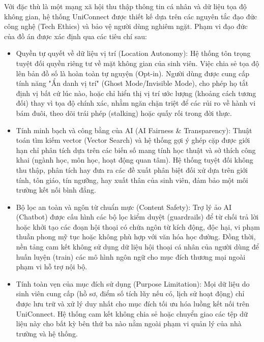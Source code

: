 Với đặc thù là một mạng xã hội thu thập thông tin cá nhân và dữ liệu tọa độ không gian, hệ thống UniConnect được thiết kế dựa trên các nguyên tắc đạo đức công nghệ (Tech Ethics) và bảo vệ người dùng nghiêm ngặt. Phạm vi đạo đức của đồ án được xác định qua các tiêu chí sau:

\begin{itemize}
    \item Quyền tự quyết về dữ liệu vị trí (Location Autonomy): Hệ thống tôn trọng tuyệt đối quyền riêng tư về mặt không gian của sinh viên. Việc chia sẻ tọa độ lên bản đồ số là hoàn toàn tự nguyện (Opt-in). Người dùng được cung cấp tính năng "Ẩn danh vị trí" (Ghost Mode/Invisible Mode), cho phép họ tắt định vị bất cứ lúc nào, hoặc chỉ hiển thị vị trí ước lượng (khoảng cách tương đối) thay vì tọa độ chính xác, nhằm ngăn chặn triệt để các rủi ro về hành vi bám đuôi, theo dõi trái phép (stalking) hoặc quấy rối trong đời thực\cite{krumm2009a}.

    \item Tính minh bạch và công bằng của AI (AI Fairness \& Transparency): Thuật toán tìm kiếm vector (Vector Search) và hệ thống gợi ý ghép cặp được giới hạn chỉ phân tích dựa trên các biến số mang tính học thuật và sở thích công khai (ngành học, môn học, hoạt động quan tâm). Hệ thống tuyệt đối không thu thập, phân tích hay đưa ra các đề xuất phân biệt đối xử dựa trên giới tính, tôn giáo, tín ngưỡng, hay xuất thân của sinh viên, đảm bảo một môi trường kết nối bình đẳng.
    
    \item Bộ lọc an toàn và ngôn từ chuẩn mực (Content Safety): Trợ lý ảo AI (Chatbot) được cấu hình các bộ lọc kiểm duyệt (guardrails) để từ chối trả lời hoặc khởi tạo các đoạn hội thoại có chứa ngôn từ kích động, độc hại, vi phạm thuần phong mỹ tục hoặc không phù hợp với văn hóa học đường. Đồng thời, nền tảng cam kết không sử dụng dữ liệu hội thoại cá nhân của người dùng để huấn luyện (train) các mô hình ngôn ngữ cho mục đích thương mại ngoài phạm vi hỗ trợ nội bộ.
    
    \item Tính toàn vẹn của mục đích sử dụng (Purpose Limitation): Mọi dữ liệu do sinh viên cung cấp (hồ sơ, điểm số tích lũy nếu có, lịch sử hoạt động) chỉ được lưu trữ và xử lý duy nhất cho mục đích tối ưu hóa luồng kết nối trên UniConnect. Hệ thống cam kết không chia sẻ hoặc chuyển giao các tệp dữ liệu này cho bất kỳ bên thứ ba nào nằm ngoài phạm vi quản lý của nhà trường và hệ thống.
\end{itemize}

